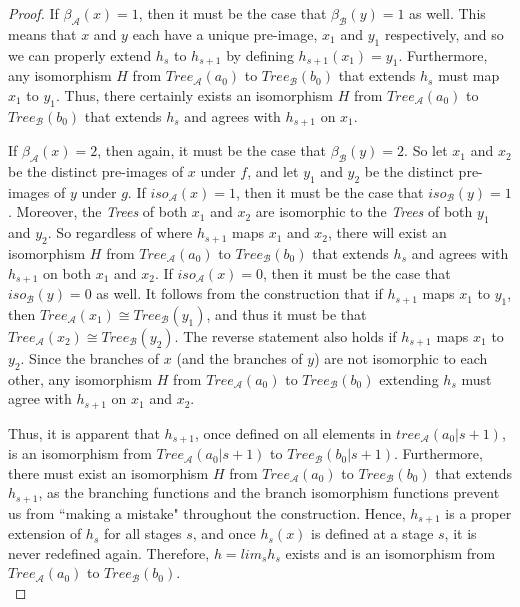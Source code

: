 \documentclass[12pt]{article}
\begin{document}
\begin{proof}
If $\beta_{\mathcal{A}}(x)=1$, then it must be the case that $\beta_{\mathcal{B}}(y)=1$ as well. This means that $x$ and $y$ each have a unique pre-image, $x_1$ and $y_1$ respectively, and so we can properly extend $h_s$ to $h_{s+1}$ by defining $h_{s+1}(x_1)=y_1$. Furthermore, any isomorphism $H$ from $Tree_\mathcal{A} (a_0)$ to $Tree_\mathcal{B} (b_0)$ that extends $h_s$ must map $x_1$ to $y_1$. Thus, there certainly exists an isomorphism $H$ from $Tree_\mathcal{A} (a_0)$ to $Tree_\mathcal{B} (b_0)$ that extends $h_s$ and agrees with $h_{s+1}$ on $x_1$.

If $\beta_{\mathcal{A}}(x)=2$, then again, it must be the case that $\beta_{\mathcal{B}}(y)=2$. So let $x_1$ and $x_2$ be the distinct pre-images of $x$ under $f$, and let $y_1$ and $y_2$ be the distinct pre-images of $y$ under $g$. If $iso_\mathcal{A}(x) = 1$, then it must be the case that $iso_\mathcal{B}(y) = 1$. Moreover, the \emph{Trees} of both $x_1$ and $x_2$ are isomorphic to the \emph{Trees} of both $y_1$ and $y_2$. So regardless of where $h_{s+1}$ maps $x_1$ and $x_2$, there will exist an isomorphism $H$ from $Tree_\mathcal{A} (a_0)$ to $Tree_\mathcal{B} (b_0)$ that extends $h_s$ and agrees with $h_{s+1}$ on both $x_1$ and $x_2$. If $iso_\mathcal{A}(x) = 0$, then it must be the case that $iso_\mathcal{B}(y) = 0$ as well. It follows from the construction that if $h_{s+1}$ maps $x_1$ to $y_1$, then $Tree_\mathcal{A} (x_1) \cong Tree_\mathcal{B} (y_1)$, and thus it must be that $Tree_\mathcal{A} (x_2) \cong Tree_\mathcal{B} (y_2)$. The reverse statement also holds if $h_{s+1}$ maps $x_1$ to $y_2$. Since the branches of $x$ (and the branches of $y$) are not isomorphic to each other, any isomorphism $H$ from $Tree_\mathcal{A} (a_0)$ to $Tree_\mathcal{B} (b_0)$ extending $h_s$ must agree with $h_{s+1}$ on $x_1$ and $x_2$. 

Thus, it is apparent that $h_{s+1}$, once defined on all elements in $tree_\mathcal{A} (a_0|s+1)$, is an isomorphism from $Tree_\mathcal{A} (a_0|s+1)$ to $Tree_\mathcal{B} (b_0|s+1)$. Furthermore, there must exist an isomorphism $H$ from $Tree_\mathcal{A} (a_0)$ to $Tree_\mathcal{B} (b_0)$ that extends $h_{s+1}$, as the branching functions and the branch isomorphism functions prevent us from ``making a mistake" throughout the construction. Hence, $h_{s+1}$ is a proper extension of $h_s$ for all stages $s$, and once $h_s(x)$ is defined at a stage $s$, it is never redefined again. Therefore, $h=lim_s h_s$ exists and is an isomorphism from $Tree_\mathcal{A} (a_0)$ to $Tree_\mathcal{B} (b_0)$.\\


\end{proof}
\end{document}

